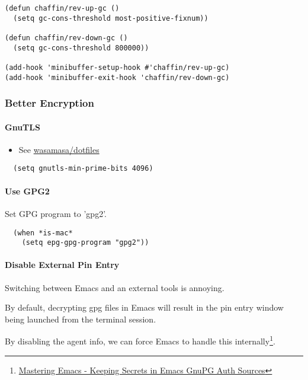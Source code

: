 \documentclass[11pt]{article}
\begin{document}
\begin{verbatim}
(defun chaffin/rev-up-gc ()
  (setq gc-cons-threshold most-positive-fixnum))

(defun chaffin/rev-down-gc ()
  (setq gc-cons-threshold 800000))

(add-hook 'minibuffer-setup-hook #'chaffin/rev-up-gc)
(add-hook 'minibuffer-exit-hook 'chaffin/rev-down-gc)
\end{verbatim}

\subsubsection*{Better Encryption}
\label{sec:org510fb11}
\paragraph*{GnuTLS}
\label{sec:org64ec1e7}

\begin{itemize}
\item See \href{https://github.com/wasamasa/dotemacs/blob/master/init.org\#gnutls}{wasamasa/dotfiles}
\end{itemize}

\begin{verbatim}
  (setq gnutls-min-prime-bits 4096)
\end{verbatim}

\paragraph*{Use GPG2}
\label{sec:org76544e5}

Set GPG program to 'gpg2'.

\begin{verbatim}
  (when *is-mac*
    (setq epg-gpg-program "gpg2"))
\end{verbatim}

\paragraph*{Disable External Pin Entry}
\label{sec:org384fce5}

Switching between Emacs and an external tools is annoying.

By default, decrypting gpg files in Emacs will result in the pin entry
window being launched from the terminal session.

By disabling the agent info, we can force Emacs to handle this
internally\footnote{\href{https://www.masteringemacs.org/article/keeping-secrets-in-emacs-gnupg-auth-sources}{Mastering Emacs - Keeping Secrets in Emacs GnuPG Auth Sources}}.
\end{document}
